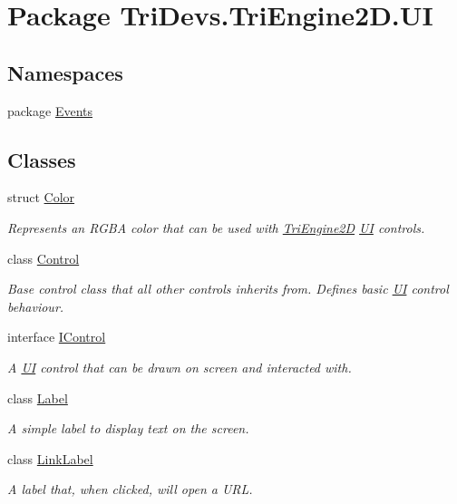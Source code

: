 \hypertarget{namespace_tri_devs_1_1_tri_engine2_d_1_1_u_i}{\section{Package Tri\-Devs.\-Tri\-Engine2\-D.\-U\-I}
\label{namespace_tri_devs_1_1_tri_engine2_d_1_1_u_i}
}
\subsection*{Namespaces}
\begin{DoxyCompactItemize}
\item 
package \hyperlink{namespace_tri_devs_1_1_tri_engine2_d_1_1_u_i_1_1_events}{Events}
\end{DoxyCompactItemize}
\subsection*{Classes}
\begin{DoxyCompactItemize}
\item 
struct \hyperlink{struct_tri_devs_1_1_tri_engine2_d_1_1_u_i_1_1_color}{Color}
\begin{DoxyCompactList}\small\item\em Represents an R\-G\-B\-A color that can be used with \hyperlink{namespace_tri_devs_1_1_tri_engine2_d}{Tri\-Engine2\-D} \hyperlink{namespace_tri_devs_1_1_tri_engine2_d_1_1_u_i}{U\-I} controls. \end{DoxyCompactList}\item 
class \hyperlink{class_tri_devs_1_1_tri_engine2_d_1_1_u_i_1_1_control}{Control}
\begin{DoxyCompactList}\small\item\em Base control class that all other controls inherits from. Defines basic \hyperlink{namespace_tri_devs_1_1_tri_engine2_d_1_1_u_i}{U\-I} control behaviour. \end{DoxyCompactList}\item 
interface \hyperlink{interface_tri_devs_1_1_tri_engine2_d_1_1_u_i_1_1_i_control}{I\-Control}
\begin{DoxyCompactList}\small\item\em A \hyperlink{namespace_tri_devs_1_1_tri_engine2_d_1_1_u_i}{U\-I} control that can be drawn on screen and interacted with. \end{DoxyCompactList}\item 
class \hyperlink{class_tri_devs_1_1_tri_engine2_d_1_1_u_i_1_1_label}{Label}
\begin{DoxyCompactList}\small\item\em A simple label to display text on the screen. \end{DoxyCompactList}\item 
class \hyperlink{class_tri_devs_1_1_tri_engine2_d_1_1_u_i_1_1_link_label}{Link\-Label}
\begin{DoxyCompactList}\small\item\em A label that, when clicked, will open a U\-R\-L. \end{DoxyCompactList}\end{DoxyCompactItemize}
